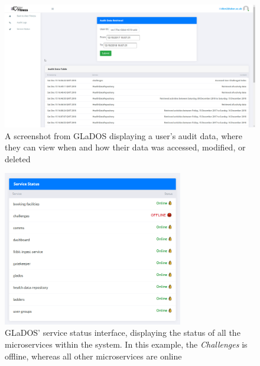 \begin{figure}[H]
    \centering
    \includegraphics[width=\textwidth]{Images/service_glados.png}
    \caption{A screenshot from GLaDOS displaying a user's audit data, where they can view when and how their data was accessed, modified, or deleted}
\end{figure}

\begin{figure}[H]
    \centering
    \includegraphics[width=0.7\textwidth]{Images/service_status.png}
    \caption{GLaDOS' service status interface, displaying the status of all the microservices within the system. In this example, the \textit{Challenges} is offline, whereas all other microservices are online}
\end{figure}